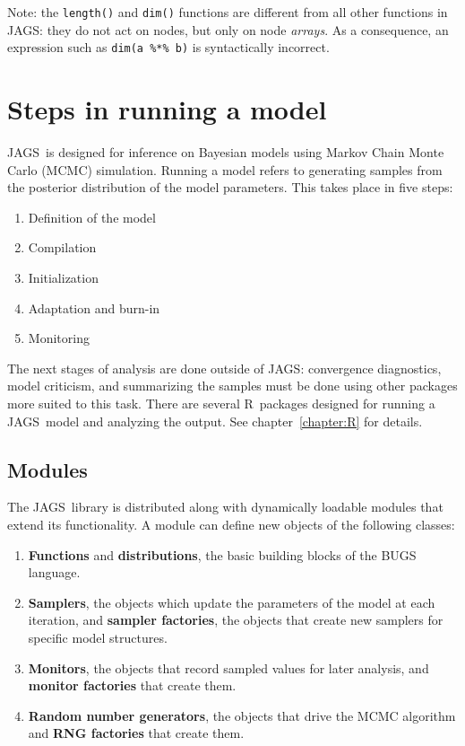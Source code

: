 \documentclass[11pt, a4paper, titlepage]{report}
\newcommand{\JAGS}{\textsf{JAGS}}
\newcommand{\R}{\textsf{R}}
\begin{document}
Note: the \verb+length()+ and \verb+dim()+ functions are different
from all other functions in \JAGS: they do not act on nodes, but only
on node {\em arrays}. As a consequence, an expression such as
\verb+dim(a %*% b)+ is syntactically incorrect.

\chapter{Steps in running a model}
\label{chapter:running}

\JAGS\ is designed for inference on Bayesian models using Markov Chain
Monte Carlo (MCMC) simulation.  Running a model refers to generating
samples from the posterior distribution of the model parameters.  This
takes place in five steps:
\begin{enumerate}
\item Definition of the model
\item Compilation
\item Initialization
\item Adaptation and burn-in
\item Monitoring
\end{enumerate}
The next stages of analysis are done outside of \JAGS: convergence
diagnostics, model criticism, and summarizing the samples must be done
using other packages more suited to this task. There are several
\R\ packages designed for running a \JAGS\ model and analyzing the
output. See chapter~\ref{chapter:R} for details.

\section{Modules}
\label{section:modules}

The \JAGS\ library is distributed along with dynamically loadable
modules that extend its functionality.  A module can define new
objects of the following classes:
\begin{enumerate}
\item {\bf Functions} and {\bf distributions}, the basic building
blocks of the BUGS language.
\item {\bf Samplers}, the objects which update the parameters of the
model at each iteration, and {\bf sampler factories}, the objects that 
create new samplers for specific model structures.
\item {\bf Monitors}, the objects that record sampled values for
later analysis, and {\bf monitor factories} that create them. 
\item {\bf Random number generators}, the objects that drive the
MCMC algorithm and {\bf RNG factories} that create them.
\end{enumerate}
\end{document}

